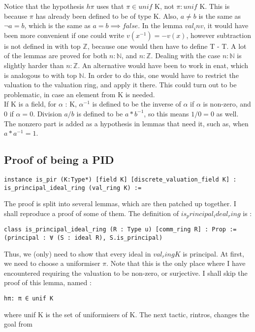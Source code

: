 \documentclass[10pt, a4paper]{article}
\begin{document}
Notice that the hypothesis $h\pi$ uses that $\pi \in unif$ K, not $\pi : unif$ K. This is because $\pi$ has already been defined to be of type K. Also, $a \neq b$ is the same as $ \lnot a = b$, which is the same as $a = b \implies false$. In the lemma $val_inv$, it would have been more convenient if one could write $v(x^{-1}) = - v(x)$, however subtraction is not defined in with top $\mathbb{Z}$, because one would then have to define T - T. A lot of the lemmas are proved for both $n : \mathbb{N}$, and $n : \mathbb{Z}$. Dealing with the case $n : \mathbb{N}$ is slightly harder than $n : \mathbb{Z}$. An alternative would have been to work in enat, which is analogous to with top $\mathbb{N}$. In order to do this, one would have to restrict the valuation to the valuation ring, and apply it there. This could turn out to be problematic, in case an element from K is needed. \\

If K is a field, for $\alpha$ : K, $\alpha^{-1}$ is defined to be the inverse of $\alpha$ if $\alpha$ is non-zero, and 0 if $\alpha=0$. Division $a/b$ is defined to be $a*b^{-1}$, so this means $1/0=0$ as well. The nonzero part is added as a hypothesis in lemmas that need it, such as, when $a*a^{-1} = 1$.

\subsection{Proof of being a PID}

\begin{lstlisting}
instance is_pir (K:Type*) [field K] [discrete_valuation_field K] : is_principal_ideal_ring (val_ring K) :=
\end{lstlisting}

The proof is split into several lemmas, which are then patched up together. I shall reproduce a proof of some of them. The definition of $is_principal_ideal_ring$ is : 

\begin{lstlisting}
class is_principal_ideal_ring (R : Type u) [comm_ring R] : Prop :=
(principal : ∀ (S : ideal R), S.is_principal)
\end{lstlisting}

Thus, we (only) need to show that every ideal in $val_ring K$ is principal. At first, we need to choose a uniformiser $\pi$. Note that this is the only place where I have encountered requiring the valuation to be non-zero, or surjective. I shall skip the proof of this lemma, named : 
\begin{lstlisting}
hπ: π ∈ unif K
\end{lstlisting}
where unif K is the set of uniformisers of K. The next tactic, rintros, changes the goal from 
\end{document}

